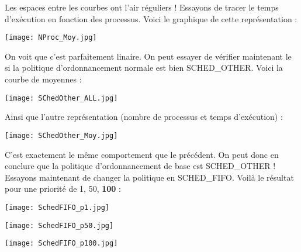 Les espaces entre les courbes ont l'air réguliers ! Essayons de tracer le temps d'exécution en fonction des processus. Voici le graphique de cette représentation :
 
\begin{center} 
\hspace{12.45cm}
\texttt{[image: NProc\_Moy.jpg]}
\end{center}
\vspace{1cm}

\pagebreak On voit que c'est parfaitement linaire. On peut essayer de vérifier maintenant le si la politique d'ordonnancement normale est bien SCHED\_OTHER. Voici la courbe de moyennes :

\begin{center} 
\hspace{12.45cm}
\texttt{[image: SChedOther\_ALL.jpg]}
\end{center}
\vspace{1cm}

Ainsi que l'autre représentation (nombre de processus et temps d'exécution) :

\begin{center} 
\hspace{12.45cm}
\texttt{[image: SChedOther\_Moy.jpg]}
\end{center}
\vspace{1cm}

\pagebreak C'est exactement le même comportement que le précédent. On peut donc en conclure que la politique d'ordonnancement de base est SCHED\_OTHER ! Essayons maintenant de changer la politique en SCHED\_FIFO. Voilà le résultat pour une priorité de 1, 50, \textbf{100} :

\begin{center} 
\hspace{12.45cm}
\texttt{[image: SchedFIFO\_p1.jpg]}
\end{center}
\vspace{0.5cm}

\begin{center} 
\hspace{12.45cm}
\texttt{[image: SchedFIFO\_p50.jpg]}
\end{center}
\vspace{0.5cm}

\begin{center} 
\hspace{12.45cm}
\texttt{[image: SchedFIFO\_p100.jpg]}
\end{center}
\vspace{0.5cm}

